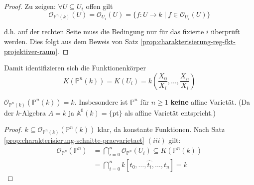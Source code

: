 \begin{proof}
  Zu zeigen: $\forall U\subseteq U_{i}$ offen gilt
  \[
    \mathcal{O}_{\mathbb{P}^{n}(k)}(U)=\mathcal{O}_{U_{i}}(U)=\{f:U\rightarrow k\mid f\in\mathcal{O}_{U_{i}}(U)\}
  \]

  d.h. auf der rechten Seite muss die Bedingung nur für das fixierte
  $i$ überprüft werden. Dies folgt aus dem Beweis von Satz \ref{prop:charakterisierung-reg-fkt-projektiver-raum}.
\end{proof}
Damit identifizieren sich die Funktionenkörper 
\[
  K(\mathbb{P}^{n}(k))=K(U_{i})=k\left(\frac{X_{0}}{X_{i}},\ldots,\frac{X_{n}}{X_{i}}\right)
\]

\begin{prop}[orig. 53]
  \label{prop:globale-schnitte-des-proj-raums}
  $\mathcal{O}_{\mathbb{P}^{n}(k)}(\mathbb{P}^{n}(k))=k$. Insbesondere
  ist $\mathbb{P}^{n}$ für $n\geq1$ \textbf{keine} affine Varietät.
  (Da der $k$-Algebra $A = k$ ja $\mathbb{A}^{0}(k)=\{\text{pt}\}$ als
  affine Varietät entspricht.)
\end{prop}
\begin{proof}
  $k\subseteq\mathcal{O}_{\mathbb{P}^{n}(k)}(\mathbb{P}^{n}(k))$ klar, da konstante Funktionen. Nach Satz \ref{prop:charakterisierung-schnitte-praevarietaet} $(iii)$ gilt:
  \begin{align*}
    \mathcal{O}_{\mathbb{P}^{n}}(\mathbb{P}^{n}) & =\bigcap_{i=0}^{n}\mathcal{O}_{\mathbb{P}^{n}}(U_{i})\subseteq K(\mathbb{P}^{n}(k))\\
                                                 & =\bigcap_{i=0}^{n}k[t_{0},\ldots,\hat{t_{i}},\ldots,t_{n}]=k
  \end{align*}
\end{proof}

